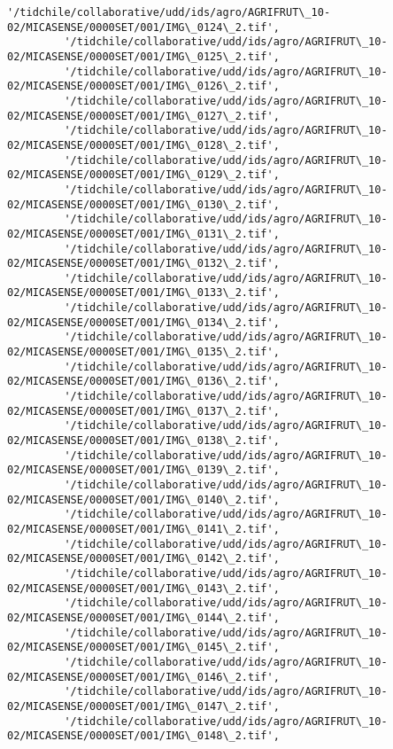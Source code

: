 \documentclass[11pt]{article}
\begin{document}
\begin{Verbatim}[commandchars=\\\{\}]
         '/tidchile/collaborative/udd/ids/agro/AGRIFRUT\_10-02/MICASENSE/0000SET/001/IMG\_0124\_2.tif',
         '/tidchile/collaborative/udd/ids/agro/AGRIFRUT\_10-02/MICASENSE/0000SET/001/IMG\_0125\_2.tif',
         '/tidchile/collaborative/udd/ids/agro/AGRIFRUT\_10-02/MICASENSE/0000SET/001/IMG\_0126\_2.tif',
         '/tidchile/collaborative/udd/ids/agro/AGRIFRUT\_10-02/MICASENSE/0000SET/001/IMG\_0127\_2.tif',
         '/tidchile/collaborative/udd/ids/agro/AGRIFRUT\_10-02/MICASENSE/0000SET/001/IMG\_0128\_2.tif',
         '/tidchile/collaborative/udd/ids/agro/AGRIFRUT\_10-02/MICASENSE/0000SET/001/IMG\_0129\_2.tif',
         '/tidchile/collaborative/udd/ids/agro/AGRIFRUT\_10-02/MICASENSE/0000SET/001/IMG\_0130\_2.tif',
         '/tidchile/collaborative/udd/ids/agro/AGRIFRUT\_10-02/MICASENSE/0000SET/001/IMG\_0131\_2.tif',
         '/tidchile/collaborative/udd/ids/agro/AGRIFRUT\_10-02/MICASENSE/0000SET/001/IMG\_0132\_2.tif',
         '/tidchile/collaborative/udd/ids/agro/AGRIFRUT\_10-02/MICASENSE/0000SET/001/IMG\_0133\_2.tif',
         '/tidchile/collaborative/udd/ids/agro/AGRIFRUT\_10-02/MICASENSE/0000SET/001/IMG\_0134\_2.tif',
         '/tidchile/collaborative/udd/ids/agro/AGRIFRUT\_10-02/MICASENSE/0000SET/001/IMG\_0135\_2.tif',
         '/tidchile/collaborative/udd/ids/agro/AGRIFRUT\_10-02/MICASENSE/0000SET/001/IMG\_0136\_2.tif',
         '/tidchile/collaborative/udd/ids/agro/AGRIFRUT\_10-02/MICASENSE/0000SET/001/IMG\_0137\_2.tif',
         '/tidchile/collaborative/udd/ids/agro/AGRIFRUT\_10-02/MICASENSE/0000SET/001/IMG\_0138\_2.tif',
         '/tidchile/collaborative/udd/ids/agro/AGRIFRUT\_10-02/MICASENSE/0000SET/001/IMG\_0139\_2.tif',
         '/tidchile/collaborative/udd/ids/agro/AGRIFRUT\_10-02/MICASENSE/0000SET/001/IMG\_0140\_2.tif',
         '/tidchile/collaborative/udd/ids/agro/AGRIFRUT\_10-02/MICASENSE/0000SET/001/IMG\_0141\_2.tif',
         '/tidchile/collaborative/udd/ids/agro/AGRIFRUT\_10-02/MICASENSE/0000SET/001/IMG\_0142\_2.tif',
         '/tidchile/collaborative/udd/ids/agro/AGRIFRUT\_10-02/MICASENSE/0000SET/001/IMG\_0143\_2.tif',
         '/tidchile/collaborative/udd/ids/agro/AGRIFRUT\_10-02/MICASENSE/0000SET/001/IMG\_0144\_2.tif',
         '/tidchile/collaborative/udd/ids/agro/AGRIFRUT\_10-02/MICASENSE/0000SET/001/IMG\_0145\_2.tif',
         '/tidchile/collaborative/udd/ids/agro/AGRIFRUT\_10-02/MICASENSE/0000SET/001/IMG\_0146\_2.tif',
         '/tidchile/collaborative/udd/ids/agro/AGRIFRUT\_10-02/MICASENSE/0000SET/001/IMG\_0147\_2.tif',
         '/tidchile/collaborative/udd/ids/agro/AGRIFRUT\_10-02/MICASENSE/0000SET/001/IMG\_0148\_2.tif',

\end{Verbatim}
\end{document}
